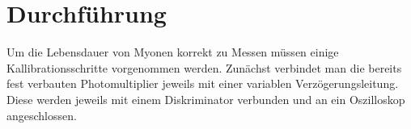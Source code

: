\section{Durchführung}
\label{sec:Durchführung}
Um die Lebensdauer von Myonen korrekt zu Messen müssen einige Kallibrationsschritte vorgenommen werden. Zunächst verbindet man die bereits fest verbauten Photomultiplier jeweils mit einer variablen Verzögerungsleitung.
Diese werden jeweils mit einem Diskriminator verbunden und an ein Oszilloskop angeschlossen. 

\newpage